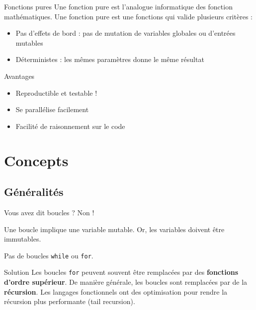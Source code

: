 \documentclass[aspectratio=169]{beamer}
\begin{document}
\begin{frame}{Fonctions pures}
    Une fonction pure est l'analogue informatique des fonction mathématiques.
    Une fonction pure est une fonctions qui valide plusieurs critères :
    \begin{itemize}
        \item Pas d'effets de bord : pas de mutation de variables globales ou d'entrées mutables
        \item Déterministes : les mêmes paramètres donne le même résultat
    \end{itemize}

    \pause

    \begin{block}{Avantages}
        \begin{itemize}
            \item Reproductible et testable !

            \item Se parallélise facilement
    
            \item Facilité de raisonnement sur le code
        \end{itemize}

    \end{block}
    
\end{frame}

\section{Concepts}

\subsection{Généralités}

\begin{frame}[fragile]{Vous avez dit boucles ?}
    Non !

    Une boucle implique une variable mutable. Or, les variables doivent être immutables.
    
    Pas de boucles \verb|while| ou \verb|for|.
    \pause
    \begin{block}{Solution}
        Les boucles \verb|for| peuvent souvent être remplacées par des \textbf{fonctions d'ordre supérieur}.
        De manière générale, les boucles sont remplacées par de la \textbf{récursion}.
        Les langages fonctionnels ont des optimisation pour rendre la récursion plus performante (tail recursion).
    \end{block}
\end{frame}
\end{document}
